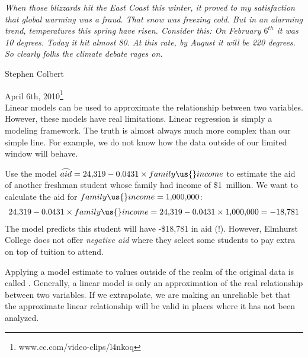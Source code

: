 {\em\small When those blizzards hit the East Coast this winter,
it proved to my satisfaction that global warming was a fraud.
That snow was freezing cold.
But in an alarming trend, temperatures this spring have risen.
Consider this: On February $6^{th}$ it was 10 degrees.
Today it hit almost 80. At this rate, by August it will be
220 degrees.
So clearly folks the climate debate rages on.\vspace{0.5mm}}

\noindent\hspace{\textwidth}\hspace{-40mm}Stephen Colbert

\noindent\hspace{\textwidth}\hspace{-40mm}April 6th,
2010\footnote{
    {www.cc.com/video-clips/l4nkoq}} \\

Linear models can be used to approximate the relationship
between two variables.
However, these models have real limitations.
Linear regression is simply a modeling framework.
The truth is almost always much more complex than our simple line.
For example, we do not know how the data outside of our limited
window will behave.

\begin{examplewrap}
\begin{nexample}{Use the model
    $\widehat{aid}
      = \text{24,319} - 0.0431 \times family\us{}income$
    to estimate the aid of another freshman student whose
    family had income of \$1~million.}
  We want to calculate the aid for
  $family\us{}income = \text{1,000,000}$:
  \begin{align*}
  \text{24,319} - 0.0431\times family\us{}income
    = \text{24,319} - 0.0431\times \text{1,000,000}
    = -\text{18,781}
  \end{align*}
  The model predicts this student will have -\$18,781 in aid (!).
  However, Elmhurst College does not offer \emph{negative aid}
  where they select some students to pay extra on top of tuition
  to attend.
\end{nexample}
\end{examplewrap}

Applying a model estimate to values outside of the realm of the
original data is called .
Generally, a linear model is only an approximation of the real
relationship between two variables.
If we extrapolate, we are making an unreliable bet that the
approximate linear relationship will be valid in places where
it has not been analyzed.


